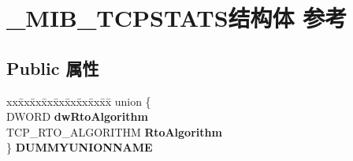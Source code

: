 \hypertarget{struct___m_i_b___t_c_p_s_t_a_t_s}{}\section{\+\_\+\+M\+I\+B\+\_\+\+T\+C\+P\+S\+T\+A\+T\+S结构体 参考}
\label{struct___m_i_b___t_c_p_s_t_a_t_s}
\subsection*{Public 属性}
\begin{DoxyCompactItemize}
\item 
\mbox{\label{struct___m_i_b___t_c_p_s_t_a_t_s_af939f55785edf7722d1434bb240548de}} 
\begin{tabbing}
xx\=xx\=xx\=xx\=xx\=xx\=xx\=xx\=xx\=\kill
union \{\\
\>DWORD {\bfseries dwRtoAlgorithm}\\
\>TCP\_RTO\_ALGORITHM {\bfseries RtoAlgorithm}\\
\} {\bfseries DUMMYUNIONNAME}\\


\end{tabbing}
\end{DoxyCompactItemize}
